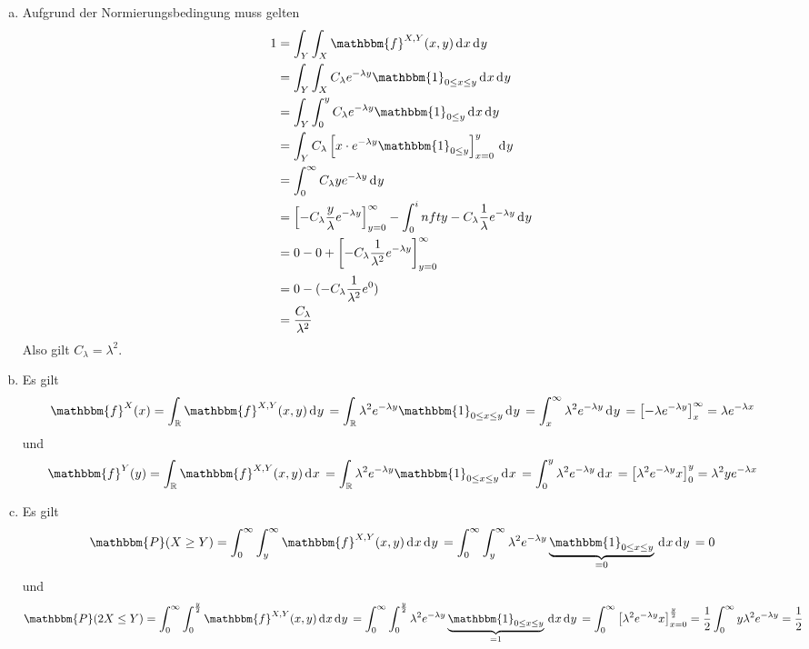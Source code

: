 \documentclass[uebung]{lecture}
\begin{document}
\begin{aufgabe}
    \begin{enumerate}[(a)]
        \item Aufgrund der Normierungsbedingung muss gelten
        \begin{align*}
            1 &= \int_Y \int_X \mathbbm{f}^{X,Y}(x,y) \d{x}\d{y}\\
            &= \int_Y \int_X C_\lambda e^{-\lambda y}\mathbbm{1}_{0\leq x\leq y} \d{x}\d{y}\\
            &= \int_Y \int_0^y C_\lambda e^{-\lambda y}\mathbbm{1}_{0\leq y} \d{x}\d{y}\\
            &= \int_Y C_\lambda \left[x \cdot e^{-\lambda y}\mathbbm{1}_{0\leq y}\right]_{x=0}^y \d{y}\\
            &= \int_0^\infty C_\lambda y e^{-\lambda y} \d{y}\\
            &= \left[-C_\lambda \frac{y}{\lambda}e^{-\lambda y}\right]_{y=0}^\infty - \int_0^infty -C_\lambda\frac{1}{\lambda} e^{-\lambda y}\d{y}\\
            &= 0 - 0 + \left[-C_\lambda\frac{1}{\lambda^2}e^{-\lambda y}\right]_{y = 0}^\infty\\
            &= 0 - (- C_\lambda\frac{1}{\lambda^2} e^0)\\
            &= \frac{C_\lambda}{\lambda^2}
        \end{align*}
        Also gilt $C_\lambda = \lambda^2$.
        \item Es gilt
        \begin{equation*}
            \mathbbm{f}^X(x) = \int_\R \mathbbm{f}^{X,Y}(x,y) \d{y} = \int_\R \lambda^2 e^{-\lambda y} \mathbbm{1}_{0\leq x\leq y} \d{y} = \int_x^\infty \lambda^2 e^{-\lambda y} \d{y} = \left[-\lambda e^{-\lambda y}\right]_x^\infty = \lambda e^{-\lambda x}
        \end{equation*}
        und
        \begin{equation*}
            \mathbbm{f}^Y(y) = \int_\R \mathbbm{f}^{X,Y}(x,y) \d{x} = \int_\R \lambda^2 e^{-\lambda y} \mathbbm{1}_{0\leq x\leq y} \d{x} = \int_0^y \lambda^2 e^{-\lambda y} \d{x} = \left[\lambda^2 e^{-\lambda y} x\right]_0^y = \lambda^2 y e^{-\lambda x}
        \end{equation*}
        \item Es gilt
        \begin{equation*}
            \mathbbm{P}(X \geq Y) = \int_0^\infty\int_y^\infty \mathbbm{f}^{X,Y}(x,y) \d{x}\d{y} = \int_0^\infty\int_y^\infty \lambda^2 e^{-\lambda y} \underbrace{\mathbbm{1}_{0\leq x \leq y}}_{=0} \d{x}\d{y} = 0
        \end{equation*}
        und
        \begin{equation*}
            \mathbbm{P}(2X \leq Y) = \int_0^\infty\int_0^{\frac{y}{2}} \mathbbm{f}^{X,Y}(x,y) \d{x}\d{y} = \int_0^\infty\int_0^{\frac{y}{2}} \lambda^2 e^{-\lambda y} \underbrace{\mathbbm{1}_{0\leq x \leq y}}_{=1} \d{x}\d{y} = \int_0^{\infty} \left[\lambda^2 e^{-\lambda y}x\right]_{x = 0}^{\frac{y}{2}} = \frac{1}{2}\int_0^\infty y\lambda^2 e^{-\lambda y} =\frac{1}{2}
        \end{equation*}
    \end{enumerate}
\end{aufgabe}
\end{document}
